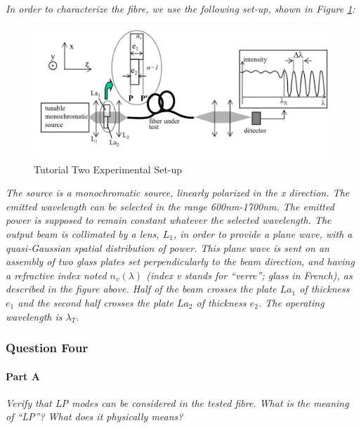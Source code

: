 \documentclass[colorlinks,11pt,a4paper,normalphoto,withhyper,ragged2e]{altareport}
\begin{document}
\textit{In order to characterize the fibre, we use the following set-up, shown in Figure \ref{fig:tutorial_two_setup}:} \linebreak


\begin{figure}[h]
	\centering
	\includegraphics[width=16cm]{Images/Tutorial-Two-setup.png}
	\caption{Tutorial Two Experimental Set-up}  %
	\label{fig:tutorial_two_setup}
\end{figure}


\textit{The source is a monochromatic source, linearly polarized in the x direction. The emitted wavelength can be selected in the range 600nm-1700nm. The emitted power is supposed to remain constant whatever the selected wavelength. The output beam is collimated by a lens, $L_1$, in order to provide a plane wave, with a quasi-Gaussian spatial distribution of power. This plane wave is sent on an assembly of two glass plates set perpendicularly to the beam direction, and having a refractive index noted $n_v(\lambda)$ (index v stands for ``verre''; glass in French), as described in the figure above. Half of the beam crosses the plate $La_1$ of thickness $e_1$ and the second half crosses the plate $La_2$ of thickness $e_2$. The operating wavelength is $\lambda_T$.} \linebreak




\subsubsection{Question Four}

\paragraph{Part A \linebreak}
\textit{Verify that LP modes can be considered in the tested fibre. What is the meaning of ``LP''? What does it physically means?} \linebreak
\end{document}

